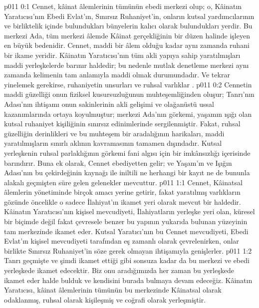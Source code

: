 \vs p011 0:1 Cennet, kâinat âlemlerinin tümünün ebedi merkezi olup; o, Kâinatın Yaratıcısı’nın Ebedi Evlat’ın, Sınırsız Ruhaniyet’in, onların kutsal yardımcılarının ve birliktelik içinde bulundukları bünyelerin kalıcı olarak bulundukları yerdir. Bu merkezi Ada, tüm merkezi âlemde Kâinat gerçekliğinin bir düzen halinde işleyen en büyük bedenidir. Cennet, maddi bir âlem olduğu kadar aynı zamanda ruhani bir ikame yeridir. Kâinatın Yaratıcısı’nın tüm akli yapıya sahip yaratılmışları maddi yerleşkelerde barınır haldedir; bu nedenle mutlak denetleme merkezi aynı zamanda kelimenin tam anlamıyla maddi olmak durumundadır. Ve tekrar yinelemek gerekirse, ruhaniyetin unsurları ve ruhsal varlıklar .
\vs p011 0:2 Cennetin maddi güzelliği onun fiziksel kusursuzluğunun muhteşemliğinden oluşur; Tanrı’nın Adası’nın ihtişamı onun sakinlerinin akli gelişimi ve olağanüstü ussal kazanımlarında ortaya koyulmuştur; merkezi Ada’nın görkemi, yaşamın ışığı olan kutsal ruhaniyet kişiliğinin sınırsız edinimlerinde sergilenmiştir. Fakat, ruhsal güzelliğin derinlikleri ve bu muhteşem bir aradalığının harikaları, maddi yaratılmışların sınırlı aklının kavramasının tamamen dışındadır. Kutsal yerleşkenin ruhsal parlaklığının görkemi fani algısı için bir imkânsızlığı içerisinde barındırır. Buna ek olarak, Cennet ebediyetten gelir; ve Yaşam’ın ve Işığın Adası’nın bu çekirdeğinin kaynağı ile iniltili ne herhangi bir kayıt ne de bununla alakalı geçmişten süre gelen gelenekler mevcuttur.
\vs p011 1:1 Cennet, Kâinatsal âlemlerin yönetiminde birçok amacı yerine getirir, fakat yaratılmış varlıkların gözünde öncelikle o sadece İlahiyat’ın ikamet yeri olarak mevcut bir haldedir. Kâinatın Yaratıcısı’nın kişisel mevcudiyeti, İlahiyatların yerleşke yeri olan, küresel bir biçimde değil fakat çevresele benzer bu yapının yukarıda bulunan yüzeyinin tam merkezinde ikamet eder. Kutsal Yaratıcı’nın bu Cennet mevcudiyeti, Ebedi Evlat’ın kişisel mevcudiyeti tarafından eş zamanlı olarak çevrelenirken, onlar birlikte Sınırsız Ruhaniyet’in söze gerek olmayan ihtişamıyla genişlerler.
\vs p011 1:2 Tanrı geçmişte ve şimdi ikamet ettiği gibi sonsuza kadar da bu merkezi ve ebedi yerleşkede ikamet edecektir. Biz onu aradığımızda her zaman bu yerleşkede ikamet eder halde bulduk ve kendisini burada bulmaya devam edeceğiz. Kâinatın Yaratıcısı, kâinat âlemlerinin tümünün bu merkezinde Kâinatsal olarak odaklanmış, ruhsal olarak kişileşmiş ve coğrafi olarak yerleşmiştir.
